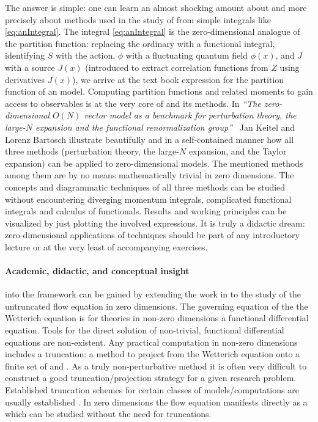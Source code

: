The answer is simple: one can learn an almost shocking amount about \qfts{} and more precisely about methods used in the study of \qfts{} from simple integrals like \eqref{eq:anIntegral}. 
The integral \nolinebreak[3]\eqref{eq:anIntegral} is the zero-dimensional analogue of the partition function: replacing the ordinary with a functional integral, identifying $S$ with the action, $\phi$ with a fluctuating quantum field $\phi(x)$, and $J$ with a source $J(x)$ (introduced to extract correlation functions from $Z$ using derivatives \wrt{} $J(x)$), we arrive at the text book expression for the partition function of an  model.
Computing partition functions and related moments to gain access to observables is at the very core of \qft{} and its methods. 
In \textit{``The zero-dimensional $O(N)$ vector model as a benchmark for perturbation theory, the large-$N$ expansion and the functional renormalization group''}~\cite{Keitel:2011pn} Jan Keitel and Lorenz Bartosch illustrate beautifully and in a self-contained manner how all three methods (perturbation theory, the large-$N$ expansion, and the \frg{} Taylor expansion) can be applied to zero-dimensional \ON{} models.
The mentioned \qft{} methods \dash{} \frg{} among them \dash{} are by no means mathematically trivial in zero dimensions.
The concepts and diagrammatic techniques of all three methods can be studied without encountering diverging momentum integrals, complicated functional integrals and calculus of functionals.
Results and working principles can be visualized by just plotting the involved expressions.
It is truly a didactic dream: zero-dimensional applications of \qft{} techniques should be part of any introductory lecture or at the very least of accompanying exercises. 

\paragraph{Academic, didactic, and conceptual insight} into the \frg{} framework can be gained by extending the work in  to the study of the untruncated \frg{} flow equation in zero dimensions.
The governing equation of the \frg{} \dash{} the Wetterich equation \dash{} is for theories in non-zero dimensions a functional differential equation.
Tools for the direct solution of non-trivial, functional differential equations are non-existent.
Any practical \frg{} computation in non-zero dimensions includes a truncation: a method to project from the Wetterich equation onto a finite set of \odes{} and \pdes{}.
As a truly non-perturbative method it is often \apriori{} very difficult to construct a good truncation/projection strategy for a given research problem. 
Established truncation schemes for certain classes of models/computations are usually established \aposteriori{}.
In zero dimensions the \frg{} flow equation manifests directly as a \pde{} which can be studied without the need for truncations. 

